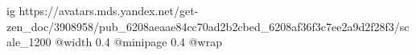  
 
 
 
 

\ifcmt
  ig https://avatars.mds.yandex.net/get-zen_doc/3908958/pub_6208aeaae84cc70ad2b2cbed_6208af36f3c7ee2a9d2f28f3/scale_1200
  @width 0.4
  @minipage 0.4
  @wrap \parpic[r]
\fi
